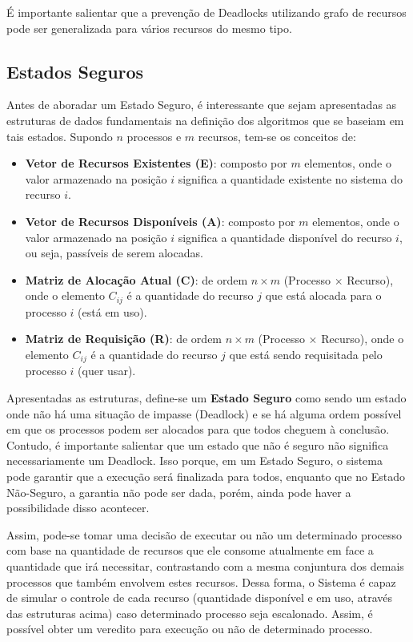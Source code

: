 	É importante salientar que a prevenção de Deadlocks utilizando grafo de recursos pode ser generalizada para vários recursos do mesmo tipo.

	\subsection{Estados Seguros}\label{sec:sec}
	Antes de aboradar um Estado Seguro, é interessante que sejam apresentadas as estruturas de dados fundamentais na definição dos algoritmos que se baseiam em tais estados. Supondo $n$ processos e $m$ recursos, tem-se os conceitos de:
	\begin{itemize}
		\item \textbf{Vetor de Recursos Existentes (E)}: composto por $m$ elementos, onde o valor armazenado na posição $i$ significa a quantidade existente no sistema do recurso $i$.
		\item \textbf{Vetor de Recursos Disponíveis (A)}: composto por $m$ elementos, onde o valor armazenado na posição $i$ significa a quantidade disponível do recurso $i$, ou seja, passíveis de serem alocadas.
		\item \textbf{Matriz de Alocação Atual (C)}: de ordem $n \times m$ (Processo $\times$ Recurso), onde o elemento $C_{ij}$ é a quantidade do recurso $j$ que está alocada para o processo $i$ (está em uso).
		\item \textbf{Matriz de Requisição (R)}: de ordem $n \times m$ (Processo $\times$ Recurso), onde o elemento $C_{ij}$ é a quantidade do recurso $j$ que está sendo requisitada pelo processo $i$ (quer usar).
	\end{itemize}
	Apresentadas as estruturas, define-se um \textbf{Estado Seguro} como sendo um estado onde não há uma situação de impasse (Deadlock) e se há alguma ordem possível em que os processos podem ser alocados para que todos cheguem à conclusão. Contudo, é importante salientar que um estado que não é seguro não significa necessariamente um Deadlock. Isso porque, em um Estado Seguro, o sistema pode garantir que a execução será finalizada para todos, enquanto que no Estado Não-Seguro, a garantia não pode ser dada, porém, ainda pode haver a possibilidade disso acontecer.

	Assim, pode-se tomar uma decisão de executar ou não um determinado processo com base na quantidade de recursos que ele consome atualmente em face a quantidade que irá necessitar, contrastando com a mesma conjuntura dos demais processos que também envolvem estes recursos. Dessa forma, o Sistema é capaz de simular o controle de cada recurso (quantidade disponível e em uso, através das estruturas acima) caso determinado processo seja escalonado. Assim, é possível obter um veredito para execução ou não de determinado processo.

